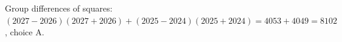 Group differences of squares: $(2027-2026)(2027+2026)+(2025-2024)(2025+2024)=4053+4049=\boxed{8102}$, choice A.
